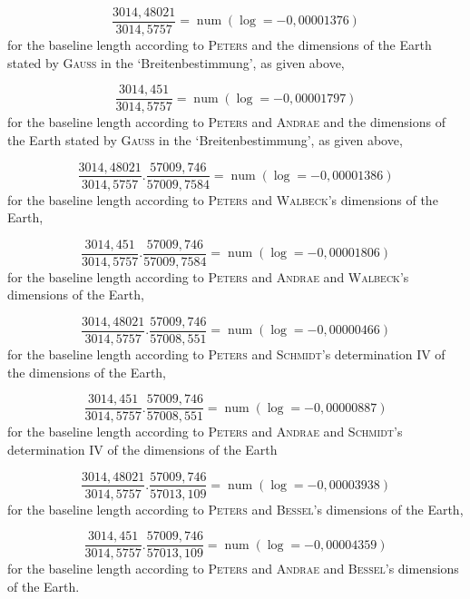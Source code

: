 %
\[
\dfrac{3014{,}48021}{3014{,}5757}=\operatorname{num}(\log=-0{,}00001376)
\]
\noindent for the baseline length according to \textsc{Peters} and the dimensions of the Earth stated by \textsc{Gauss} in the ‘Breitenbestimmung’, as given above,
\par

\[
\dfrac{3014{,}451}{3014{,}5757}=\operatorname{num}(\log=-0{,}00001797)
\]
\noindent for the baseline length according to \textsc{Peters} and \textsc{Andrae} and the dimensions of the Earth stated by \textsc{Gauss} in the ‘Breitenbestimmung’, as given above,
\par

\[
\dfrac{3014{,}48021}{3014{,}5757}.\dfrac{57009{,}746}{57009{,}7584}=\operatorname{num}(\log=-0{,}00001386)
\]
\noindent for the baseline length according to \textsc{Peters} and \textsc{Walbeck}’s dimensions of the Earth,
\par

\[
\dfrac{3014{,}451}{3014{,}5757}.\dfrac{57009{,}746}{57009{,}7584}=\operatorname{num}(\log=-0{,}00001806)
\]
\noindent for the baseline length according to \textsc{Peters} and \textsc{Andrae} and \textsc{Walbeck}’s dimensions of the Earth,
\par

\[
\dfrac{3014{,}48021}{3014{,}5757}.\dfrac{57009{,}746}{57008{,}551}=\operatorname{num}(\log=-0{,}00000466)
\]
\noindent for the baseline length according to \textsc{Peters} and \textsc{Schmidt}’s determination IV of the dimensions of the Earth,
\par

\[
\dfrac{3014{,}451}{3014{,}5757}.\dfrac{57009{,}746}{57008{,}551}=\operatorname{num}(\log=-0{,}00000887)
\]
\noindent for the baseline length according to \textsc{Peters} and \textsc{Andrae} and \textsc{Schmidt}’s determination IV of the dimensions of the Earth
\par

\[
\dfrac{3014{,}48021}{3014{,}5757}.\dfrac{57009{,}746}{57013{,}109}=\operatorname{num}(\log=-0{,}00003938)
\]
\noindent for the baseline length according to \textsc{Peters} and \textsc{Bessel}’s dimensions of the Earth,
\par

\[
\dfrac{3014{,}451}{3014{,}5757}.\dfrac{57009{,}746}{57013{,}109}=\operatorname{num}(\log=-0{,}00004359)
\]
\noindent for the baseline length according to \textsc{Peters} and \textsc{Andrae} and \textsc{Bessel}’s dimensions of the Earth.
\par

